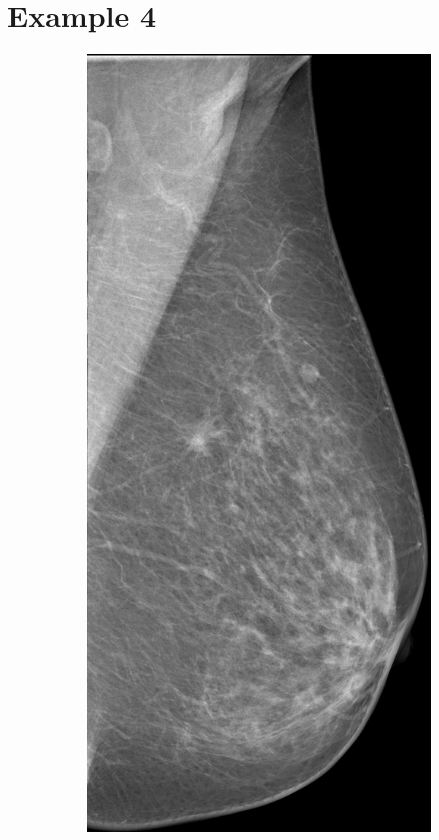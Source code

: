 \newpage
\section{Example 4}
\begin{figure}[h]
	\centering
	\begin{subfigure}{0.2\textwidth}
		\centering
			\includegraphics[width=\textwidth]{plots/examples/mammogram_4.png}

\end{subfigure}
\end{figure}
